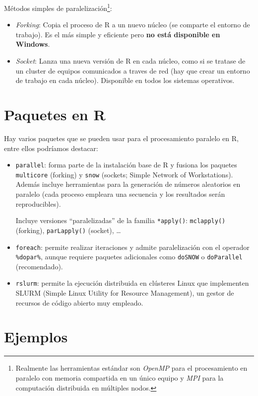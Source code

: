 \documentclass[
]{book}
\theoremstyle{break}
\theoremstyle{nonumberplain}
\let\oldfootnote\footnote
\renewcommand\footnote[1]{\oldfootnote{\hspace{2mm}#1}}
\begin{document}
Métodos simples de paralelización\footnote{Realmente las herramientas estándar son
  \emph{OpenMP} para el procesamiento en paralelo con memoria compartida en un único equipo
  y \emph{MPI} para la computación distribuida en múltiples nodos.}:

\begin{itemize}
\item
  \emph{Forking}: Copia el proceso de R a un nuevo núcleo (se comparte el entorno de trabajo).
  Es el más simple y eficiente pero \textbf{no está disponible en Windows}.
\item
  \emph{Socket}: Lanza una nueva versión de R en cada núcleo, como si se tratase de un cluster
  de equipos comunicados a traves de red (hay que crear un entorno de trabajo en cada núcleo).
  Disponible en todos los sistemas operativos.
\end{itemize}

\section{Paquetes en R}\label{paquetes-en-r}

Hay varios paquetes que se pueden usar para el procesamiento paralelo en R,
entre ellos podríamos destacar:

\begin{itemize}
\item
  \texttt{parallel}: forma parte de la instalación base de R y fusiona los paquetes
  \texttt{multicore} (forking) y \texttt{snow} (sockets; Simple Network of Workstations).
  Además incluye herramientas para la generación de números aleatorios en paralelo
  (cada proceso empleara una secuencia y los resultados serán reproducibles).

  Incluye versiones ``paralelizadas'' de la familia \texttt{*apply()}:
  \texttt{mclapply()} (forking), \texttt{parLapply()} (socket), \ldots{}
\item
  \texttt{foreach}: permite realizar iteraciones y admite paralelización con el operador \texttt{\%dopar\%},
  aunque requiere paquetes adicionales como \texttt{doSNOW} o \texttt{doParallel} (recomendado).
\item
  \texttt{rslurm}: permite la ejecución distribuida en clústeres Linux que implementen
  SLURM (Simple Linux Utility for Resource Management),
  un gestor de recursos de código abierto muy empleado.
\end{itemize}

\section{Ejemplos}\label{ejemplos-3}
\end{document}
